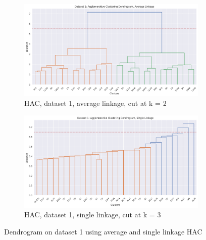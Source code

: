 \documentclass[12pt]{article}
\begin{document}
\begin{figure}[ht]
  \centering
  \begin{subfigure}{0.6\textwidth}
    \centering
    \includegraphics[width=\linewidth]{a.png}
    \caption{HAC, dataset 1, average linkage, cut at k = 2}
    \label{fig:a}
  \end{subfigure}%
  \vspace{1em} %
  \begin{subfigure}{0.6\textwidth}
    \centering
    \includegraphics[width=\linewidth]{b.png}
    \caption{HAC, dataset 1, single linkage, cut at k = 3}
    \label{fig:b}
  \end{subfigure}%
  \caption{Dendrogram on dataset 1 using average and single linkage HAC}
  \label{fig:dend_1}
\end{figure}
\end{document}
